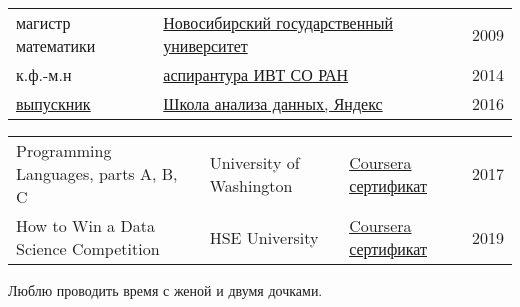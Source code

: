 \documentclass[11pt]{article}
\begin{document}
\vspace{-2.5em}

\begin{longtable} {p{}p{}l}
  магистр математики & \href{https://www.nsu.ru/}{Новосибирский государственный университет} & 2009 \vspace{0.5em} \\
	к.ф.-м.н & \href{http://www.ict.nsc.ru/ru/education/postgraduate}{аспирантура ИВТ СО РАН} & 2014 \vspace{0.5em}\\
  \href{https://academy.yandex.ru/dataschool/life}{выпускник} & \href{https://yandexdataschool.ru}{Школа анализа данных, Яндекс} & 2016 \vspace{0.5em}\\
\end{longtable}

\vspace{-1.0em}

\vspace{-0.5em}
\begin{longtable} {p{}p{}ll}
	Programming Languages, parts A, B, C &
	University of Washington & \href{https://coursera.org/share/3e187e640ed6df57b0a84ecb8a82ddab}{Coursera сертификат} & 2017 \vspace{0.5em}\\
	How to Win a Data Science Competition & HSE University & \href{https://coursera.org/share/0ad3f02a08a405800c29d5909caece90}{Coursera сертификат} & 2019   \vspace{0.5em}\\
\end{longtable}

\vspace{-1.0em}


Люблю проводить время с женой и двумя дочками.
\end{document}
